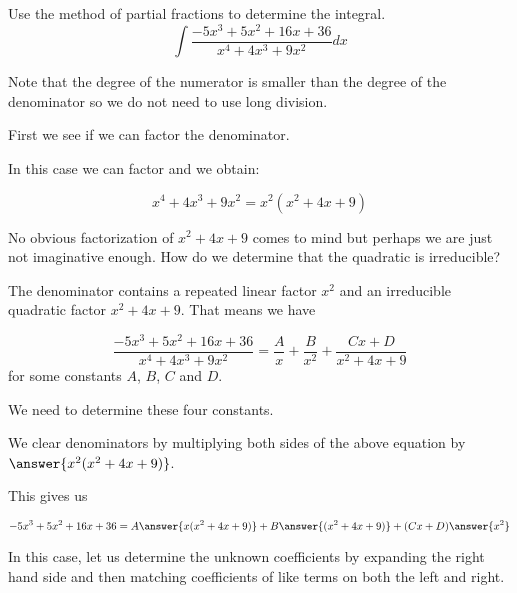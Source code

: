 \documentclass{ximera}
\author{Jim Talamo and Jason Miller}
\begin{document}
\begin{exercise}
Use the method of partial fractions to determine the integral.
\[
\int \frac{-5x^3+5x^2+16x+36}{x^{4}+4x^3+9x^2} dx
\]

Note that the degree of the numerator is smaller than the degree of the denominator so we do not need 
to use long division. 

First we see if we can factor the denominator. 

In this case we can factor and we obtain:

\[
x^{4}+4x^3+9x^2=x^2(x^2+4x+9)
\]

No obvious factorization of $x^2+4x+9$ comes to mind but perhaps we are just not imaginative enough.  How do we determine that the quadratic is irreducible?

\begin{multipleChoice}
\end{multipleChoice}


  \begin{multipleChoice}
  \end{multipleChoice}

\begin{exercise} 

The denominator contains a repeated linear factor $x^2$ and an irreducible quadratic factor $x^2+4x+9$. 
That means we have

\[
 \frac{-5x^3+5x^2+16x+36}{x^{4}+4x^3+9x^2}= \frac{A}{x} + \frac{B}{x^2} +\frac{Cx+D}{x^2+4x+9}
\]
for some constants $A$, $B$, $C$ and $D$.

We need to determine these four constants. 

We clear denominators by multiplying both sides of the above equation by $\answer{x^2(x^2+4x+9)}$. 

This gives us 

\[
-5x^3+5x^2+16x+36=A\answer{ x(x^2+4x+9)} + B\answer{ (x^2+4x+9)} +  (Cx+D)\answer{x^2}
\]

In this case, let us determine the unknown coefficients by expanding the right hand side and then matching coefficients of like terms on both the left and right. 


\end{exercise}
\end{exercise}
\end{document}
